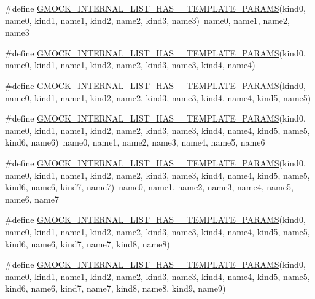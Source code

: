 \begin{DoxyCompactItemize}
\#define \mbox{\hyperlink{gmock-generated-actions_8h_a6b509ec43356784c0bb70056dcd2c5a2}{G\+M\+O\+C\+K\+\_\+\+I\+N\+T\+E\+R\+N\+A\+L\+\_\+\+L\+I\+S\+T\+\_\+\+H\+A\+S\+\_\+\_\+\+T\+E\+M\+P\+L\+A\+T\+E\+\_\+\+P\+A\+R\+A\+MS}}(kind0,  name0,  kind1,  name1,  kind2,  name2,  kind3,  name3)~name0, name1, name2, name3
\item 
\#define \mbox{\hyperlink{gmock-generated-actions_8h_ad9010efd4cfd9c4874d18fef3aee7676}{G\+M\+O\+C\+K\+\_\+\+I\+N\+T\+E\+R\+N\+A\+L\+\_\+\+L\+I\+S\+T\+\_\+\+H\+A\+S\+\_\+\_\+\+T\+E\+M\+P\+L\+A\+T\+E\+\_\+\+P\+A\+R\+A\+MS}}(kind0,  name0,  kind1,  name1,  kind2,  name2,  kind3,  name3,  kind4,  name4)
\item 
\#define \mbox{\hyperlink{gmock-generated-actions_8h_ae9d4c983c2aba6b0fa5725118bb11cbd}{G\+M\+O\+C\+K\+\_\+\+I\+N\+T\+E\+R\+N\+A\+L\+\_\+\+L\+I\+S\+T\+\_\+\+H\+A\+S\+\_\+\_\+\+T\+E\+M\+P\+L\+A\+T\+E\+\_\+\+P\+A\+R\+A\+MS}}(kind0,  name0,  kind1,  name1,  kind2,  name2,  kind3,  name3,  kind4,  name4,  kind5,  name5)
\item 
\#define \mbox{\hyperlink{gmock-generated-actions_8h_ad76d91a49b437e52790b3d7efeb6f289}{G\+M\+O\+C\+K\+\_\+\+I\+N\+T\+E\+R\+N\+A\+L\+\_\+\+L\+I\+S\+T\+\_\+\+H\+A\+S\+\_\+\_\+\+T\+E\+M\+P\+L\+A\+T\+E\+\_\+\+P\+A\+R\+A\+MS}}(kind0,  name0,  kind1,  name1,  kind2,  name2,  kind3,  name3,  kind4,  name4,  kind5,  name5,  kind6,  name6)~name0, name1, name2, name3, name4, name5, name6
\item 
\#define \mbox{\hyperlink{gmock-generated-actions_8h_a1080c34f9f1d183b54b4b710b5a6e98d}{G\+M\+O\+C\+K\+\_\+\+I\+N\+T\+E\+R\+N\+A\+L\+\_\+\+L\+I\+S\+T\+\_\+\+H\+A\+S\+\_\+\_\+\+T\+E\+M\+P\+L\+A\+T\+E\+\_\+\+P\+A\+R\+A\+MS}}(kind0,  name0,  kind1,  name1,  kind2,  name2,  kind3,  name3,  kind4,  name4,  kind5,  name5,  kind6,  name6,  kind7,  name7)~name0, name1, name2, name3, name4, name5, name6, name7
\item 
\#define \mbox{\hyperlink{gmock-generated-actions_8h_a2492e9cf6abea9975cc7703e24fb4409}{G\+M\+O\+C\+K\+\_\+\+I\+N\+T\+E\+R\+N\+A\+L\+\_\+\+L\+I\+S\+T\+\_\+\+H\+A\+S\+\_\+\_\+\+T\+E\+M\+P\+L\+A\+T\+E\+\_\+\+P\+A\+R\+A\+MS}}(kind0,  name0,  kind1,  name1,  kind2,  name2,  kind3,  name3,  kind4,  name4,  kind5,  name5,  kind6,  name6,  kind7,  name7,  kind8,  name8)
\item 
\#define \mbox{\hyperlink{gmock-generated-actions_8h_ab216ed7cf202e5c97e4a4e4115c416d2}{G\+M\+O\+C\+K\+\_\+\+I\+N\+T\+E\+R\+N\+A\+L\+\_\+\+L\+I\+S\+T\+\_\+\+H\+A\+S\+\_\+\_\+\+T\+E\+M\+P\+L\+A\+T\+E\+\_\+\+P\+A\+R\+A\+MS}}(kind0,  name0,  kind1,  name1,  kind2,  name2,  kind3,  name3,  kind4,  name4,  kind5,  name5,  kind6,  name6,  kind7,  name7,  kind8,  name8,  kind9,  name9)

\end{DoxyCompactItemize}
